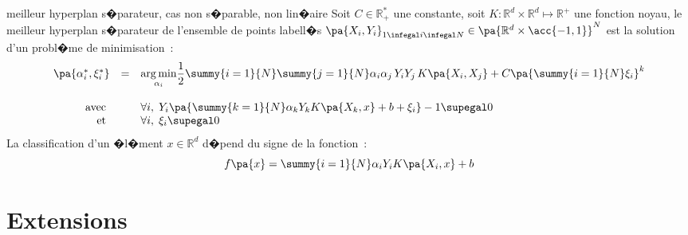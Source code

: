             \begin{xproblem}{meilleur hyperplan s�parateur, cas non s�parable, non lin�aire}\label{svm_problem_def_4}
            Soit $C \in \mathbb{R}^*_+$ une constante, soit $K : \mathbb{R}^d \times \mathbb{R}^d \longmapsto \mathbb{R}^+$ une fonction noyau,
            le meilleur hyperplan s�parateur de l'ensemble de points labell�s
            $\pa{X_i,Y_i}_{1 \infegal i \infegal N} \in \pa{ \mathbb{R}^d \times \acc{-1,1} }^N$ est la solution
            d'un probl�me de minimisation~: 
                    $$
                    \begin{array}{rcl}    \pa{\alpha_i^*, \xi_i^*} &=& \underset{\alpha_i}{\arg \min} \dfrac{1}{2}  
                                                                                    \summy{i=1}{N}\summy{j=1}{N}
                                                                                            \alpha_i \alpha_j \,
                                                                                            Y_i Y_j \,
                                                                                            K\pa{X_i,X_j}
                                                                                    + C \pa{\summy{i=1}{N} \xi_i}^k \\ \\
                                         \text{avec }      && \forall i, \;  Y_i \pa{ \summy{k=1}{N} \alpha_k Y_k K\pa{X_k,x} + b + \xi_i } - 1 \supegal 0 \\
                                         \text{et }            && \forall i, \; \xi_i \supegal 0 
                    \end{array}                                        
                    $$
            La classification d'un �l�ment $x \in \mathbb{R}^d$ d�pend du signe de la fonction~:
                    $$
                    f\pa{x} = \summy{i=1}{N} \alpha_i Y_i K\pa{X_i,x} + b
                    $$
            \end{xproblem}
            
            
\section{Extensions}

